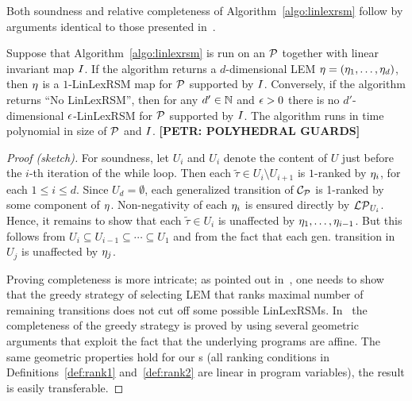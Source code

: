Both soundness and relative completeness of Algorithm~\ref{algo:linlexrsm} follow by arguments identical to those presented in~\cite{xxx}. 
\begin{theorem}
\label{thm:algo}
	Suppose that Algorithm~\ref{algo:linlexrsm} is run on an \APP{} $\mathcal{P}$ 
	together with linear invariant map $I$. If the algorithm returns a 
	$d$-dimensional LEM $\mathbf{\eta}=(\eta_1,\dots,\eta_d)$, then $\mathbf{\eta}$ 
	is a $1$-LinLexRSM map for $\mathcal{P}$ supported by $I$. Conversely, if 
	the algorithm returns ``No LinLexRSM'', then for any $d'\in \mathbb{N}$ and 
	$\epsilon>0$ there is no $d'$-dimensional $\epsilon$-LinLexRSM for $\mathcal{P}$  
	supported by $I$. The algorithm runs in time polynomial in size of 
	$\mathcal{P}$ and $I$. \textbf{[PETR: POLYHEDRAL GUARDS]}
\end{theorem}
\begin{proof}[Proof (sketch)]
For soundness, let $U_i$ and $U_{i}$ denote the content of $U$ just before the $i$-th iteration of the while loop. Then each $\tilde{\tau}\in U_{i}\setminus U_{i+1}$ is $1$-ranked by $\eta_i$, for each $1\leq i \leq d$. Since $U_{d}=\emptyset$, each generalized transition of $\mathcal{C}_{\mathcal{P}}$ is 1-ranked by some component of $\mathbf{\eta}$. Non-negativity of each $\eta_i$ is ensured directly by $\mathcal{LP}_{U_i}$. Hence, it remains to show that each $\tilde{\tau}\in U_i$ is unaffected by $\eta_1,\dots,\eta_{i-1}$. But this follows from $U_i \subseteq U_{i-1}\subseteq \cdots\subseteq U_1$ and from the fact that each gen. transition in $U_j$ is unaffected by $\eta_j$.

Proving completeness is more intricate; as pointed out in~\cite{xxx}, one needs to show that the greedy strategy of selecting LEM that ranks maximal number of remaining transitions does not cut off some possible LinLexRSMs. In~\cite{xxx} the completeness of the greedy strategy is proved by using several geometric arguments that exploit the fact that the underlying programs are affine. The same geometric properties hold for our \APP{}s (all ranking conditions in Definitions~\ref{def:rank1} and~\ref{def:rank2} are linear in program variables), the result is easily transferable.
\end{proof}

\